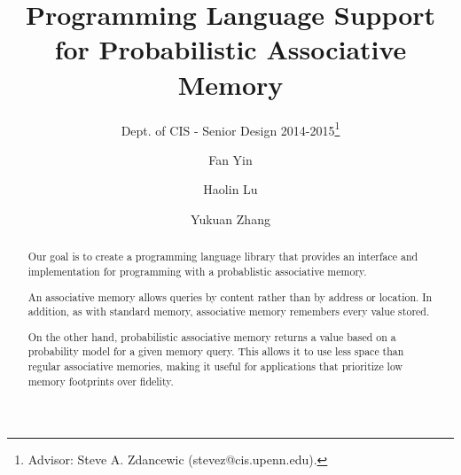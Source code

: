 \documentclass{sig-alternate}
\begin{document}
 

\title{Programming Language Support for Probabilistic Associative Memory}
\subtitle{Dept. of CIS - Senior Design 2014-2015\thanks{Advisor: Steve A. Zdancewic (stevez@cis.upenn.edu).}}
\author{
    Fan Yin \\ 
    \and Haolin Lu \\ 
    \and Yukuan Zhang\\ 
}
%
%
\date{}
\maketitle

\begin{abstract}
    Our goal is to create a programming language library that provides an interface and implementation 
    for programming with a probablistic associative memory. 
    
    An associative memory allows queries by content rather than by address or location.
    In addition, as with standard memory, associative memory remembers every value stored.

    On the other hand, probabilistic associative memory returns a value based on a probability model 
    for a given memory query. This allows it to use less space than regular
    associative memories, making it useful for applications that prioritize low memory footprints over 
    fidelity. 
    
\end{abstract}
\end{document}
